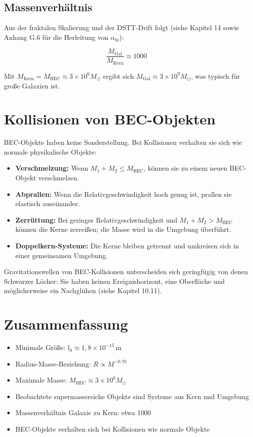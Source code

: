 \subsection{Massenverhältnis}

Aus der fraktalen Skalierung und der DSTT-Drift folgt (siehe Kapitel 14 
sowie Anhang G.6 für die Herleitung von \( \alpha_{\text{in}} \)):

\[
\frac{M_{\text{Gal}}}{M_{\text{Kern}}} \approx 1000 \tag{L.22}
\]

Mit \( M_{\text{Kern}} = M_{\text{BEC}} \approx 3 \times 10^6 M_{\odot} \) 
ergibt sich \( M_{\text{Gal}} \approx 3 \times 10^9 M_{\odot} \), 
was typisch für große Galaxien ist.

\section{Kollisionen von BEC-Objekten}

BEC-Objekte haben keine Sonderstellung. Bei Kollisionen verhalten sie sich 
wie normale physikalische Objekte:

\begin{itemize}
    \item \textbf{Verschmelzung:} Wenn \( M_1 + M_2 \leq M_{\text{BEC}} \), 
          können sie zu einem neuen BEC-Objekt verschmelzen.
    \item \textbf{Abprallen:} Wenn die Relativgeschwindigkeit hoch genug ist, 
          prallen sie elastisch auseinander.
    \item \textbf{Zerrüttung:} Bei geringer Relativgeschwindigkeit und 
          \( M_1 + M_2 > M_{\text{BEC}} \) können die Kerne zerreißen; 
          die Masse wird in die Umgebung überführt.
    \item \textbf{Doppelkern-Systeme:} Die Kerne bleiben getrennt und 
          umkreisen sich in einer gemeinsamen Umgebung.
\end{itemize}

Gravitationswellen von BEC-Kollisionen unterscheiden sich geringfügig 
von denen Schwarzer Löcher: Sie haben keinen Ereignishorizont, eine 
Oberfläche und möglicherweise ein Nachglühen (siehe Kapitel 10.11).

\section{Zusammenfassung}

\begin{itemize}
    \item Minimale Größe: \( l_0 \approx 1,8 \times 10^{-15} \, \text{m} \)
    \item Radius-Masse-Beziehung: \( R \propto M^{-0,91} \)
    \item Maximale Masse: \( M_{\text{BEC}} \approx 3 \times 10^6 M_{\odot} \)
    \item Beobachtete supermassereiche Objekte sind Systeme aus Kern und Umgebung
    \item Massenverhältnis Galaxie zu Kern: etwa 1000
    \item BEC-Objekte verhalten sich bei Kollisionen wie normale Objekte
\end{itemize}

